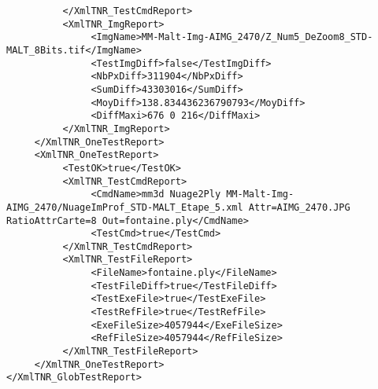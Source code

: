 \documentclass[a4paper]{book}
\begin{document}
\begin{lstlisting}
          </XmlTNR_TestCmdReport>
          <XmlTNR_ImgReport>
               <ImgName>MM-Malt-Img-AIMG_2470/Z_Num5_DeZoom8_STD-MALT_8Bits.tif</ImgName>
               <TestImgDiff>false</TestImgDiff>
               <NbPxDiff>311904</NbPxDiff>
               <SumDiff>43303016</SumDiff>
               <MoyDiff>138.834436236790793</MoyDiff>
               <DiffMaxi>676 0 216</DiffMaxi>
          </XmlTNR_ImgReport>
     </XmlTNR_OneTestReport>
     <XmlTNR_OneTestReport>
          <TestOK>true</TestOK>
          <XmlTNR_TestCmdReport>
               <CmdName>mm3d Nuage2Ply MM-Malt-Img-AIMG_2470/NuageImProf_STD-MALT_Etape_5.xml Attr=AIMG_2470.JPG  RatioAttrCarte=8 Out=fontaine.ply</CmdName>
               <TestCmd>true</TestCmd>
          </XmlTNR_TestCmdReport>
          <XmlTNR_TestFileReport>
               <FileName>fontaine.ply</FileName>
               <TestFileDiff>true</TestFileDiff>
               <TestExeFile>true</TestExeFile>
               <TestRefFile>true</TestRefFile>
               <ExeFileSize>4057944</ExeFileSize>
               <RefFileSize>4057944</RefFileSize>
          </XmlTNR_TestFileReport>
     </XmlTNR_OneTestReport>
</XmlTNR_GlobTestReport>

\end{lstlisting}
\end{document}
